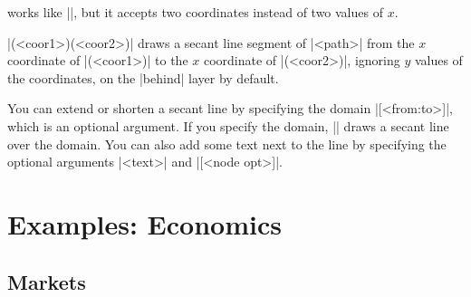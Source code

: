 \begin{tzcode}{.3}
\end{tzcode}

\icmd{\tzsecant} works like |\tzsecantat|, but it accepts two coordinates instead of two values of $x$.

|(<coor1>)(<coor2>)| draws a secant line segment of |<path>| from the $x$ coordinate of |(<coor1>)| to the $x$ coordinate of |(<coor2>)|, ignoring $y$ values of the coordinates, on the |behind| layer by default.

\begin{tzcode}{.3}
\end{tzcode}


You can extend or shorten a secant line by specifying the domain |[<from:to>]|, which is an optional argument.
If you specify the domain, |\tzsecant| draws a secant line over the domain.
You can also add some text next to the line by specifying the optional arguments |{<text>}| and |[<node opt>]|.

\begin{tzcode}{.3}
\end{tzcode}


\chapter{Examples: Economics}
\label{ci:examples}

\section{Markets}
\label{si:markets}

